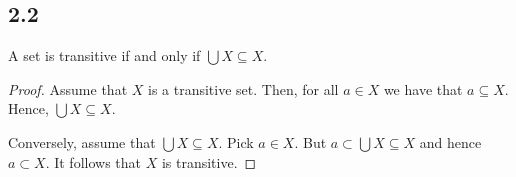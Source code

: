 \subsection*{2.2} A set is transitive if and only if $\bigcup X \subseteq X$.

\begin{proof}
    Assume that $X$ is a transitive set. Then, for all $a \in X$ we have that $a \subseteq X$. Hence, $\bigcup X \subseteq X$.

    Conversely, assume that $\bigcup X \subseteq X$. Pick $a \in X$. But $a \subset \bigcup X \subseteq X$ and hence $a \subset X$. It follows that $X$ is transitive.
\end{proof}

